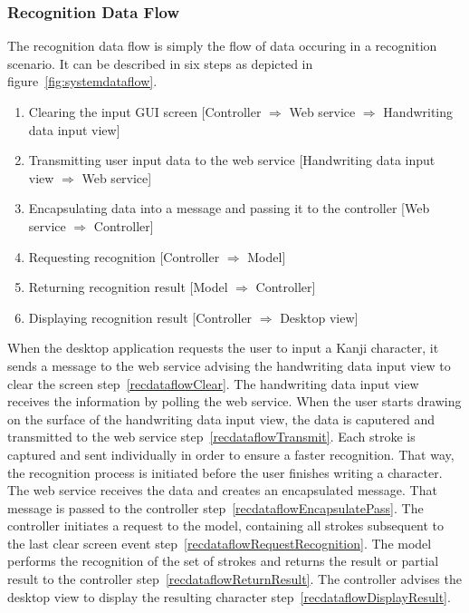 \subsubsection{Recognition Data Flow}
\label{sec:arch:recognitiondataflow}

The recognition data flow is simply the flow of data occuring in a recognition 
scenario. It can be described in six %
steps as depicted in figure~\ref{fig:systemdataflow}.
\begin{enumerate}
  \item \label{recdataflowClear} 
        Clearing the input GUI screen 
        [Controller $\Rightarrow$ Web service $\Rightarrow$ Handwriting data input view]
  \item \label{recdataflowTransmit} 
        Transmitting user input data to the web service 
        [Handwriting data input view $\Rightarrow$ Web service]
  \item \label{recdataflowEncapsulatePass} 
        Encapsulating data into a message and passing 
        it to the controller 
        [Web service $\Rightarrow$ Controller]
  \item \label{recdataflowRequestRecognition} 
        Requesting recognition 
        [Controller $\Rightarrow$ Model] 
  \item \label{recdataflowReturnResult} 
        Returning recognition result 
        [Model $\Rightarrow$ Controller] 
  \item \label{recdataflowDisplayResult} %
        Displaying recognition result 
        [Controller $\Rightarrow$ Desktop view]
\end{enumerate}
When the desktop application requests the user to input a Kanji 
character, it sends a message to the web service advising the handwriting data 
input view to clear the screen step~\ref{recdataflowClear}. 
The handwriting data input view receives the information by polling the web 
service. 
When the user starts drawing on the surface of the handwriting data input view, 
the data is caputered and transmitted to the web service 
step~\ref{recdataflowTransmit}.
Each stroke is captured and sent individually in order to ensure a faster 
recognition. That way, the recognition process is initiated before the
user finishes writing a character. The web service receives the data and 
creates an encapsulated message. That message is passed to the 
controller step~\ref{recdataflowEncapsulatePass}.
The controller initiates a request to the model, containing all strokes
subsequent to the last clear screen 
event step~\ref{recdataflowRequestRecognition}.
The model performs the recognition of the set of strokes and returns the result
or partial result to the controller step~\ref{recdataflowReturnResult}.
The controller advises the desktop view to display the resulting character
step~\ref{recdataflowDisplayResult}.

